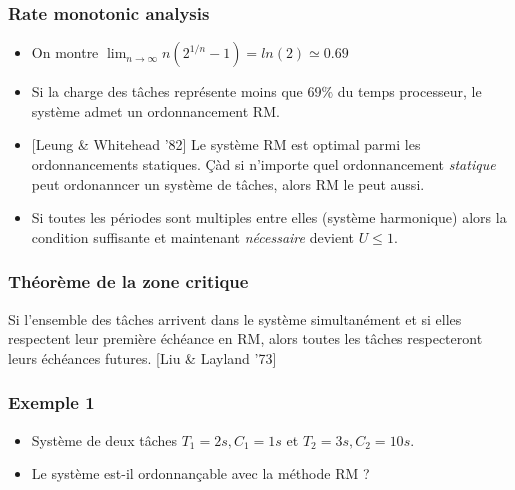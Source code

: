\documentclass[ignorenonframetext,]{beamer}
\begin{document}
\begin{frame}\frametitle{Rate monotonic analysis}

\begin{itemize}
\item
  On montre
  $\lim_{n \rightarrow \infty} n(2^{1/n} - 1) = ln(2) \simeq 0.69$
\item
  Si la charge des tâches représente moins que $69\%$ du temps
  processeur, le système admet un ordonnancement RM.
\item
  {[}Leung \& Whitehead '82{]} Le système RM est optimal parmi les
  ordonnancements statiques. Çàd si n'importe quel ordonnancement
  \emph{statique} peut ordonanncer un système de tâches, alors RM le
  peut aussi.
\item
  Si toutes les périodes sont multiples entre elles (système harmonique)
  alors la condition suffisante et maintenant \emph{nécessaire} devient
  $U \leq 1$.
\end{itemize}

\end{frame}

\begin{frame}\frametitle{Théorème de la zone critique}

Si l'ensemble des tâches arrivent dans le système simultanément et si
elles respectent leur première échéance en RM, alors toutes les tâches
respecteront leurs échéances futures. {[}Liu \& Layland '73{]}

\end{frame}

\begin{frame}\frametitle{Exemple 1}

\begin{itemize}
\item
  Système de deux tâches $T_1 = 2s, C_1 = 1s$ et $T_2 = 3s , C_2=10s$.
\item
  Le système est-il ordonnançable avec la méthode RM ?
\end{itemize}

\end{frame}
\end{document}
